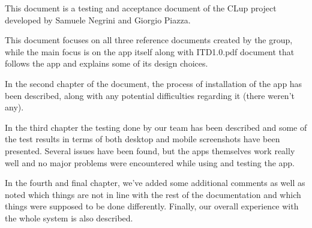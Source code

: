 \hspace{\parindent} This document is a testing and acceptance document of the CLup project developed by Samuele Negrini and Giorgio Piazza.\newline

This document focuses on all three reference documents created by the group, while the main focus is on the app itself along with ITD1.0.pdf document that follows the app and explains some of its design choices.\newline

In the second chapter of the document, the process of installation of the app has been described, along with any potential difficulties regarding it (there weren't any).\newline

In the third chapter the testing done by our team has been described and some of the test results in terms of both desktop and mobile screenshots have been presented. Several issues have been found, but the apps themselves work really well and no major problems were encountered while using and testing the app.\newline

In the fourth and final chapter, we've added some additional comments as well as noted which things are not in line with the rest of the documentation and which things were supposed to be done differently. Finally, our overall experience with the whole system is also described.